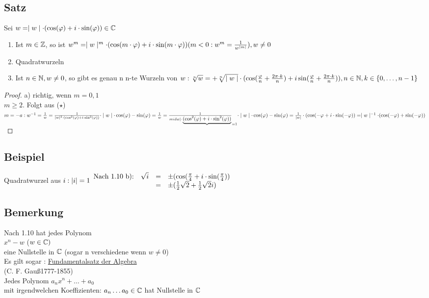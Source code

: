 \subsection{Satz}
Sei $w = \mid w \mid \cdot ( \cos(\varphi) + i \cdot \sin(\varphi)) \in \mathbb{C}$\\
\begin{enumerate}
\item[a)] Ist $m \in \mathbb{Z}$, so ist $w^m = \mid w \mid^m \cdot ( \cos(m \cdot \varphi) + i \cdot \sin(m \cdot \varphi))\\
( m < 0 : w^m = \frac{1}{w^{\mid m \mid}}), w \not = 0$\\
\item[b)] Quadratwurzeln
\item[c)] Ist $n \in \mathbb{N}, w \not = 0$, so gibt es genau n n-te Wurzeln von $w:\\
\sqrt[n]{w} = + \sqrt[n]{\mid w \mid} \cdot (\cos(\frac{\varphi}{n} + \frac{2\pi \cdot k}{n}) + i \sin(\frac{\varphi}{n}+ \frac{2\pi \cdot k}{n})), n \in \mathbb{N}  ,k \in \{0, \ldots,n-1\}$
\end{enumerate}
\begin{proof}
a) richtig, wenn $m=0,1$\\
$m \geq 2.$ Folgt aus ($\star$)\\
$m=-a:\\
w^{-1} = \frac{1}{w} = \frac{1}{\mid w \mid^2 \cdot ( \cos^2(\varphi) + i \cdot \sin^2( \varphi))} \cdot \mid w \mid \cdot \cos(\varphi) - \sin(\varphi)\\
= \frac{1}{w} = \frac{1}{mid w \mid \cdot \underbrace{( \cos^2(\varphi) + i \cdot \sin^2( \varphi))}}_{=1} \cdot \mid w \mid \cdot \cos(\varphi) - \sin(\varphi)\\
= \frac{1}{\mid w \mid } \cdot (\cos(-\varphi + i \cdot \sin(-\varphi)) = \mid w \mid^{-1} \cdot (\cos(-\varphi) + \sin(-\varphi))$\\
\end{proof}
\subsection{Beispiel}
Quadratwurzel aus $i:\\
\lvert i \rvert =1\\
\begin{array}{llcl}
\text{Nach 1.10 b):} &\sqrt{i}&=& \pm (\cos(\frac{\pi}{4} + i \cdot \sin(\frac{\pi}{4}))\\
& &=& \pm (\frac{1}{2}\sqrt{2} + \frac{1}{2}\sqrt{2}i)
\end{array}
$
\subsection{Bemerkung}
Nach 1.10 hat jedes Polynom\\
$ x^{n} -w$ ($w \in \mathbb{C})$\\
eine Nullstelle in $\mathbb{C}$ (sogar n verschiedene wenn $w \not = 0$)\\
Es gilt sogar : \underline{Fundamentalsatz der Algebra}\\
\hspace*{7.5cm} (C. F. Gau\ss 1777-1855)\\
Jedes Polynom $a_n x^n + \ldots + a_0$\\
mit irgendwelchen Koeffizienten: $a_n \ldots a_0 \in \mathbb{C}$ hat Nullstelle in $\mathbb{C}$
